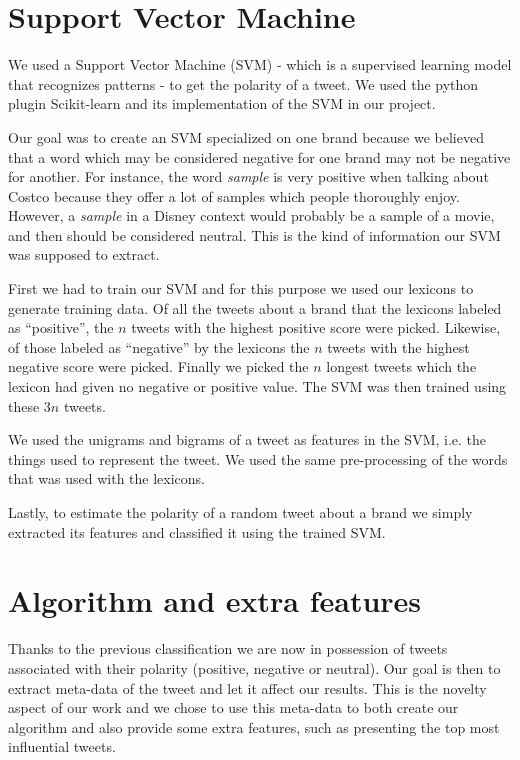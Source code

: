 \documentclass[a4paper,12pt]{report}
\begin{document}
\section{Support Vector Machine}

We used a Support Vector Machine (SVM) - which is a supervised learning model that recognizes patterns - to get the polarity of a tweet. We used the python plugin Scikit-learn\cite{Scikit} and its implementation of the SVM in our project.

Our goal was to create an SVM specialized on one brand because we believed that a word which may be considered negative for one brand may not be negative for another.
For instance, the word \textit{sample} is very positive when talking about Costco because they offer a lot of samples which people thoroughly enjoy. However, a \textit{sample} in a Disney context would probably be a sample of a movie, and then should be considered neutral.
This is the kind of information our SVM was supposed to extract.

First we had to train our SVM and for this purpose we used our lexicons to generate training data. Of all the tweets about a brand that the lexicons labeled as ``positive'', the $n$ tweets with the highest positive score were picked. Likewise, of those labeled as ``negative'' by the lexicons the $n$ tweets with the highest negative score were picked. Finally we picked the $n$ longest tweets which the lexicon had given no negative or positive value. The SVM was then trained using these $3n$ tweets.

We used the unigrams and bigrams of a tweet as features in the SVM, i.e. the things used to represent the tweet. We used the same pre-processing of the words that was used with the lexicons.

Lastly, to estimate the polarity of a random tweet about a brand we simply extracted its features and classified it using the trained SVM.

\section{Algorithm and extra features}

Thanks to the previous classification we are now in possession of tweets associated with their polarity (positive, negative or neutral). Our goal is then to extract meta-data of the tweet and let it affect our results.
This is the novelty aspect of our work and we chose to use this meta-data to both create our algorithm and also provide some extra features, such as presenting the top most influential tweets.
\end{document}
